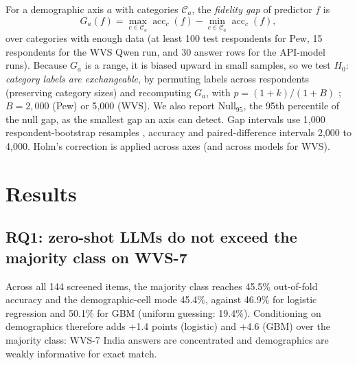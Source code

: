 \documentclass[conference]{IEEEtran}
\begin{document}
For a demographic axis $a$ with categories $\mathcal{C}_a$, the \emph{fidelity gap} of predictor $f$ is
\begin{equation}
G_a(f)=\max_{c\in\mathcal{C}_a}\operatorname{acc}_c(f)-\min_{c\in\mathcal{C}_a}\operatorname{acc}_c(f),
\end{equation}
over categories with enough data (at least 100 test respondents for Pew, 15 respondents for the WVS Qwen run, and 30 answer rows for the API-model runs). Because $G_a$ is a range, it is biased upward in small samples, so we test $H_0$: \emph{category labels are exchangeable}, by permuting labels across respondents (preserving category sizes) and recomputing $G_a$, with $p=(1+k)/(1+B)$ \cite{phipson2010}; $B=2{,}000$ (Pew) or 5{,}000 (WVS). We also report $\mathrm{Null}_{95}$, the 95th percentile of the null gap, as the smallest gap an axis can detect. Gap intervals use 1{,}000 respondent-bootstrap resamples \cite{efron1993}, accuracy and paired-difference intervals 2{,}000 to 4{,}000. Holm's correction \cite{holm1979} is applied across axes (and across models for WVS).

\section{Results}

\subsection{RQ1: zero-shot LLMs do not exceed the majority class on WVS-7}

\begin{table}[!t]
\caption{WVS-7: LLM accuracy (\%, 95\% respondent-bootstrap CI) and each baseline's accuracy on the same rows, with the paired difference LLM $-$ baseline [95\% CI] (points). API models use 30 and 40 respondents; the local Qwen run uses a larger random sample.}
\label{tab:wvs}
\centering
\footnotesize

\end{table}

Across all 144 screened items, the majority class reaches 45.5\% out-of-fold accuracy and the demographic-cell mode 45.4\%, against 46.9\% for logistic regression and 50.1\% for GBM (uniform guessing: 19.4\%). Conditioning on demographics therefore adds +1.4 points (logistic) and +4.6 (GBM) over the majority class: WVS-7 India answers are concentrated and demographics are weakly informative for exact match.
\end{document}
